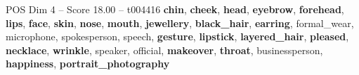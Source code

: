 \begin{textsample}{POS Dim 4 – Score 18.00 – t004416}  \label{ex:f4_pos_030}
\textbf{chin}, \textbf{cheek}, \textbf{head}, \textbf{eyebrow}, \textbf{forehead}, \textbf{lips}, \textbf{face}, \textbf{skin}, \textbf{nose}, \textbf{mouth}, \textbf{jewellery}, \textbf{black\_hair}, \textbf{earring}, formal\_wear, microphone, spokesperson, speech, \textbf{gesture}, \textbf{lipstick}, \textbf{layered\_hair}, \textbf{pleased}, \textbf{necklace}, \textbf{wrinkle}, speaker, official, \textbf{makeover}, \textbf{throat}, businessperson, \textbf{happiness}, \textbf{portrait\_photography}

\end{textsample}
